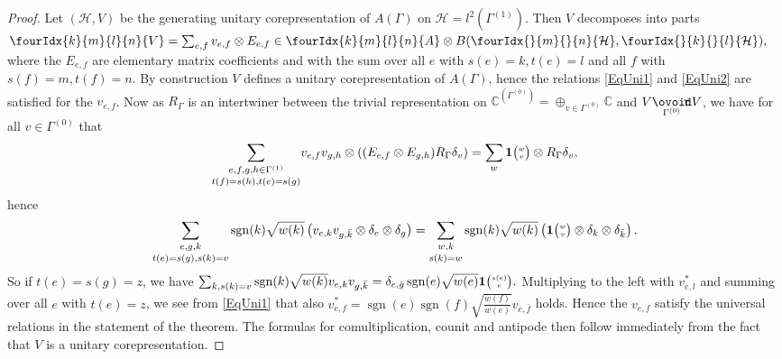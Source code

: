 \documentclass[10pt]{article}
\DeclareMathOperator{\sgn}{\mathrm{sgn}}
\newcommand{\Circtv}[1]{\underset{#1}{\mathop{\ooalign{$\ovoid$\cr\hidewidth\raise-.05ex\hbox{$\scriptstyle\mathsf T\mkern3.5mu$}\cr}}}} %
\newcommand{\C}{\mathbb{C}}
\newcommand{\Hsp}{\mathcal{H}}
\newcommand{\Grt}[3]{#1{\tiny {\begin{pmatrix} #2\\#3\end{pmatrix}}}}
\newcommand{\UnitC}[2]{\Grt{\mathbf{1}}{#1}{#2}}
\newcommand{\Gr}[5]{\fourIdx{#2}{#4}{#3}{#5}{#1}}%
\newcommand{\Gru}[3]{\Gr{#1}{}{}{#2}{#3}}
\theoremstyle{definition}
\numberwithin{equation}{section}
\begin{document}
\begin{proof} Let $(\Hsp,V)$ be the generating unitary corepresentation of $A(\Gamma)$ on $\Hsp = l^2(\Gamma^{(1)})$. Then $V$ decomposes into parts $\Gr{V}{k}{l}{m}{n} = \sum_{e,f} v_{e,f} \otimes E_{e,f} \in \Gr{A}{k}{l}{m}{n}\otimes B(\Gru{\Hsp}{m}{n},\Gru{\Hsp}{k}{l}),$ where the $E_{e,f}$ are elementary matrix coefficients and with the sum over all $e$ with $s(e)=k,t(e)=l$ and all $f$ with $s(f) = m, t(f)=n$. By construction $V$ defines a unitary corepresentation of $A(\Gamma)$, hence the relations \eqref{EqUni1} and \eqref{EqUni2} are satisfied for the $v_{e,f}$. Now as $R_{\Gamma}$ is an intertwiner between the trivial representation on $\C^{(\Gamma^{(0)})} = \oplus_{v\in \Gamma^{(0)}} \C$ and $V\Circtv{\Gamma^{(0)}} V$, we have for all $v\in \Gamma^{(0)}$ that \begin{equation}\label{EqMorR}\underset{t(f)=s(h),t(e)=s(g)}{\sum_{e,f,g,h\in \Gamma^{(1)}}} v_{e,f}v_{g,h}\otimes \left((E_{e,f}\otimes E_{g,h}) R_{\Gamma} \delta_v\right) = \sum_w \UnitC{w}{v}\otimes R_{\Gamma}\delta_v,\end{equation} hence
\[\underset{t(e)=s(g),s(k)=v}{\sum_{e,g,k}} \sgn(k)\sqrt{w(k)}\left( v_{e,k}v_{g,\bar{k}} \otimes \delta_e\otimes \delta_{g}\right) =\underset{s(k)=w}{\sum_{w,k}}\sgn(k)\sqrt{w(k)} \left(\UnitC{w}{v} \otimes \delta_k\otimes \delta_{\bar{k}}\right).\] So if $t(e) = s(g)=z$, we have $\sum_{k,s(k)=v} \sgn(k)\sqrt{w(k)} v_{e,k}v_{g,\bar{k}} =  \delta_{e,\bar{g}} \sgn(e)\sqrt{w(e)}\UnitC{s(e)}{v}.$ Multiplying to the left with $v_{e,l}^*$ and summing over all $e$ with $t(e) = z$, we see from \eqref{EqUni1} that also $v_{e,f}^* = \sgn(e)\sgn(f)\sqrt{\frac{w(f)}{w(e)}} v_{\bar{e},\bar{f}}$ holds. Hence the $v_{e,f}$ satisfy the universal relations in the statement of the theorem. The formulas for comultiplication, counit and antipode then follow immediately from the fact that $V$ is a unitary corepresentation.


\end{proof}
\end{document}
